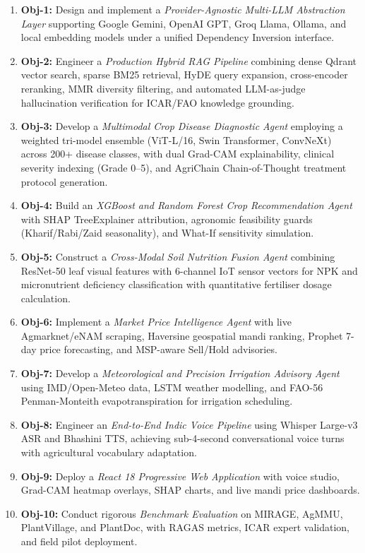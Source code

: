 \documentclass[12pt,a4paper]{article}
\begin{document}
\begin{enumerate}[itemsep=0pt,parsep=0pt,topsep=0pt]
\item \textbf{Obj-1:} Design and implement a \textit{Provider-Agnostic Multi-LLM Abstraction Layer} supporting Google Gemini, OpenAI GPT, Groq Llama, Ollama, and local embedding models under a unified Dependency Inversion interface.
\item \textbf{Obj-2:} Engineer a \textit{Production Hybrid RAG Pipeline} combining dense Qdrant vector search, sparse BM25 retrieval, HyDE query expansion, cross-encoder reranking, MMR diversity filtering, and automated LLM-as-judge hallucination verification for ICAR/FAO knowledge grounding.
\item \textbf{Obj-3:} Develop a \textit{Multimodal Crop Disease Diagnostic Agent} employing a weighted tri-model ensemble (ViT-L/16, Swin Transformer, ConvNeXt) across 200+ disease classes, with dual Grad-CAM explainability, clinical severity indexing (Grade 0--5), and AgriChain Chain-of-Thought treatment protocol generation.
\item \textbf{Obj-4:} Build an \textit{XGBoost and Random Forest Crop Recommendation Agent} with SHAP TreeExplainer attribution, agronomic feasibility guards (Kharif/Rabi/Zaid seasonality), and What-If sensitivity simulation.
\item \textbf{Obj-5:} Construct a \textit{Cross-Modal Soil Nutrition Fusion Agent} combining ResNet-50 leaf visual features with 6-channel IoT sensor vectors for NPK and micronutrient deficiency classification with quantitative fertiliser dosage calculation.
\item \textbf{Obj-6:} Implement a \textit{Market Price Intelligence Agent} with live Agmarknet/eNAM scraping, Haversine geospatial mandi ranking, Prophet 7-day price forecasting, and MSP-aware Sell/Hold advisories.
\item \textbf{Obj-7:} Develop a \textit{Meteorological and Precision Irrigation Advisory Agent} using IMD/Open-Meteo data, LSTM weather modelling, and FAO-56 Penman-Monteith evapotranspiration for irrigation scheduling.
\item \textbf{Obj-8:} Engineer an \textit{End-to-End Indic Voice Pipeline} using Whisper Large-v3 ASR and Bhashini TTS, achieving sub-4-second conversational voice turns with agricultural vocabulary adaptation.
\item \textbf{Obj-9:} Deploy a \textit{React 18 Progressive Web Application} with voice studio, Grad-CAM heatmap overlays, SHAP charts, and live mandi price dashboards.
\item \textbf{Obj-10:} Conduct rigorous \textit{Benchmark Evaluation} on MIRAGE, AgMMU, PlantVillage, and PlantDoc, with RAGAS metrics, ICAR expert validation, and field pilot deployment.
\end{enumerate}
\end{document}
